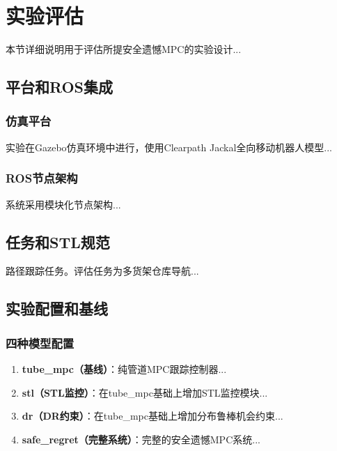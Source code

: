 \documentclass[12pt,a4paper]{ctexart}
\numberwithin{equation}{section}
\begin{document}
\clearpage
\section{实验评估}

本节详细说明用于评估所提安全遗憾MPC的实验设计...

\subsection{平台和ROS集成}

\subsubsection{仿真平台}

实验在Gazebo仿真环境中进行，使用Clearpath Jackal全向移动机器人模型...

\subsubsection{ROS节点架构}

系统采用模块化节点架构...

\subsection{任务和STL规范}

路径跟踪任务。评估任务为多货架仓库导航...

\subsection{实验配置和基线}

\subsubsection{四种模型配置}

\begin{enumerate}[label=(\arabic*)]
    \item \textbf{tube\_mpc（基线）}：纯管道MPC跟踪控制器...
    \item \textbf{stl（STL监控）}：在tube\_mpc基础上增加STL监控模块...
    \item \textbf{dr（DR约束）}：在tube\_mpc基础上增加分布鲁棒机会约束...
    \item \textbf{safe\_regret（完整系统）}：完整的安全遗憾MPC系统...
\end{enumerate}
\end{document}
